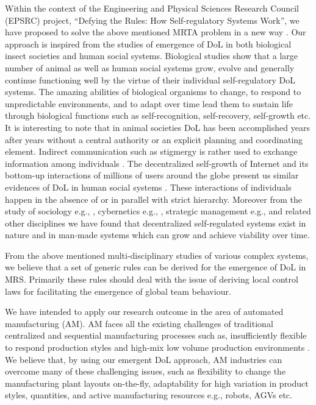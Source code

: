 Within the context of the Engineering and Physical Sciences Research Council (EPSRC) project, ``Defying the Rules: How Self-regulatory Systems Work'', we have proposed to solve the above mentioned MRTA problem in a new way \cite{Arcaute+2008}. Our approach is inspired from the studies of emergence of DoL in both  biological insect societies and human social systems.  Biological studies show that a large number of animal as well as human social systems grow, evolve and generally continue functioning well by the virtue of their individual self-regulatory DoL systems. The amazing abilities of biological organisms to change, to respond to unpredictable environments, and to adapt over time lead them to sustain life through biological functions such as self-recognition, self-recovery, self-growth etc. It is interesting to note that in animal societies DoL has been accomplished years after years without a central authority or an explicit planning and coordinating element. Indirect communication such as stigmergy is rather used to exchange information among individuals \cite{Camazine+2001}. The decentralized self-growth of Internet and its bottom-up interactions of millions of users around the globe present us similar evidences of DoL in human social systems \cite{Andriani+2004}. These interactions of individuals happen in the absence of or in parallel with strict hierarchy. Moreover from the study of sociology e.g., \cite{Sayer+1992}, cybernetics e.g., \cite{Beer1981}, strategic management e.g., \cite{Kogut2000} and related other disciplines we have found that decentralized self-regulated systems exist in nature and in man-made systems which can grow and achieve viability over time. 

From the above mentioned multi-disciplinary studies of various complex systems, we believe that a set of generic rules can be derived for the emergence of DoL in MRS. Primarily these rules should deal with the issue of deriving local control laws for facilitating the emergence of global team behaviour. 

We have intended to apply our research outcome in the area of automated manufacturing (AM). AM faces all the existing challenges of traditional centralized and sequential manufacturing processes such as, insufficiently flexible to respond production styles and high-mix low volume production environments \cite{Shen+2006}. We believe that, by using our emergent DoL approach, AM industries can overcome many of these challenging issues, such as flexibility to change the manufacturing plant layouts on-the-fly, adaptability for high variation in product styles, quantities, and active manufacturing resources e.g., robots, AGVs etc.

